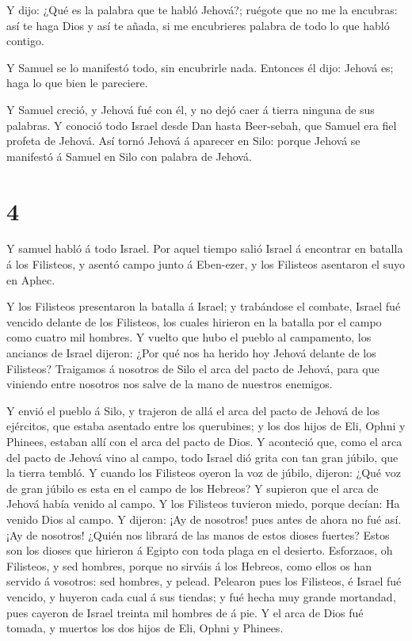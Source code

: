  Y dijo: ¿Qué es la palabra que te habló Jehová?; ruégote
que no me la encubras: así te haga Dios y así te añada, si me
encubrieres palabra de todo lo que habló contigo.

 Y Samuel se lo manifestó todo, sin encubrirle nada.
Entonces él dijo: Jehová es; haga lo que bien le pareciere.

 Y Samuel creció, y Jehová fué con él, y no dejó caer á
tierra ninguna de sus palabras.  Y conoció todo Israel
desde Dan hasta Beer-sebah, que Samuel era fiel profeta de Jehová.
 Así tornó Jehová á aparecer en Silo: porque Jehová se
manifestó á Samuel en Silo con palabra de Jehová.

\hypertarget{section-3}{%
\section{4}\label{section-3}}

 Y samuel habló á todo Israel. Por aquel tiempo salió Israel
á encontrar en batalla á los Filisteos, y asentó campo junto á
Eben-ezer, y los Filisteos asentaron el suyo en Aphec.

 Y los Filisteos presentaron la batalla á Israel; y
trabándose el combate, Israel fué vencido delante de los Filisteos, los
cuales hirieron en la batalla por el campo como cuatro mil hombres.
 Y vuelto que hubo el pueblo al campamento, los ancianos de
Israel dijeron: ¿Por qué nos ha herido hoy Jehová delante de los
Filisteos? Traigamos á nosotros de Silo el arca del pacto de Jehová,
para que viniendo entre nosotros nos salve de la mano de nuestros
enemigos.

 Y envió el pueblo á Silo, y trajeron de allá el arca del
pacto de Jehová de los ejércitos, que estaba asentado entre los
querubines; y los dos hijos de Eli, Ophni y Phinees, estaban allí con el
arca del pacto de Dios.  Y aconteció que, como el arca del
pacto de Jehová vino al campo, todo Israel dió grita con tan gran
júbilo, que la tierra tembló.  Y cuando los Filisteos oyeron
la voz de júbilo, dijeron: ¿Qué voz de gran júbilo es esta en el campo
de los Hebreos? Y supieron que el arca de Jehová había venido al campo.
 Y los Filisteos tuvieron miedo, porque decían: Ha venido
Dios al campo. Y dijeron: ¡Ay de nosotros! pues antes de ahora no fué
así.  ¡Ay de nosotros! ¿Quién nos librará de las manos de
estos dioses fuertes? Estos son los dioses que hirieron á Egipto con
toda plaga en el desierto.  Esforzaos, oh Filisteos, y sed
hombres, porque no sirváis á los Hebreos, como ellos os han servido á
vosotros: sed hombres, y pelead.  Pelearon pues los
Filisteos, é Israel fué vencido, y huyeron cada cual á sus tiendas; y
fué hecha muy grande mortandad, pues cayeron de Israel treinta mil
hombres de á pie.  Y el arca de Dios fué tomada, y muertos
los dos hijos de Eli, Ophni y Phinees.

